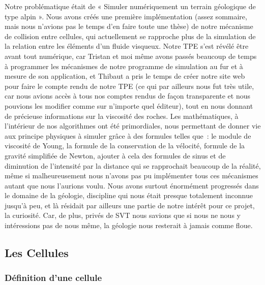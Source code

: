 \documentclass[a4paper,11pt]{article}
\begin{document}
Notre problématique était de « Simuler numériquement un terrain géologique de type alpin ».
Nous avons créés une première implémentation (assez sommaire, mais nous n'avions pas le temps d'en faire toute une thèse) de notre mécanisme de collision entre cellules, qui actuellement se rapproche plus de la simulation de la relation entre les éléments d'un fluide visqueux.
Notre TPE s'est révélé être avant tout numérique, car Tristan et moi même avons passés beaucoup de temps à programmer les mécanismes de notre programme de simulation au fur et à mesure de son application, et Thibaut a pris le temps de créer notre site web pour faire le compte rendu de notre TPE (ce qui par ailleurs nous fut très utile, car nous avions accès à tous nos comptes rendus de façon transparente et nous pouvions les modifier comme sur n'importe quel éditeur), tout en nous donnant de précieuse informations sur la viscosité des roches.
Les mathématiques, à l'intérieur de nos algorithmes ont été primordiales, nous permettant de donner vie aux principe physiques à simuler grâce à des formules telles que~: le module de viscosité de Young, la formule de la conservation de la vélocité, formule de la gravité simplifiée de Newton, ajouter à cela des formules de sinus et de diminution de l'intensité par la distance qui se rapprochait beaucoup de la réalité, même si malheureusement nous n'avons pas pu implémenter tous ces mécanismes autant que nous l'aurions voulu.
Nous avons surtout énormément progressés dans le domaine de la géologie, discipline qui nous était presque totalement inconnue jusqu'à peu, et là résidait par ailleurs une partie de notre intérêt pour ce projet, la curiosité.
Car, de plus, privés de SVT nous savions que si nous ne nous y intéressions pas de nous même, la géologie nous resterait à jamais comme floue.

\subsection{Les Cellules}
\subsubsection{Définition d'une cellule}
\end{document}
